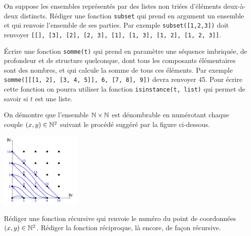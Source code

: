 \documentclass{magnolia}
\begin{document}



On suppose les ensembles représentés par des listes non triées d'éléments deux-à-deux
distincts. Rédiger une fonction \verb!subset! qui prend en argument un ensemble et qui
renvoie l'ensemble de ses parties. Par exemple \verb!subset([1,2,3])! doit
renvoyer \verb![[], [3], [2], [2, 3], [1], [1, 3], [1, 2], [1, 2, 3]]!.

Écrire une fonction \verb!somme(t)! qui prend en paramètre une séquence imbriquée, de
profondeur et de structure quelconque, dont tous les composants élémentaires sont des nombres,
et qui calcule la somme de tous ces éléments. Par exemple
\verb!somme([[[1, 2], [3, 4, 5]], 6, [7, 8], 9])! devra renvoyer 45. Pour écrire cette
fonction on pourra utiliser la fonction \verb!isinstance(t, list)! qui permet de savoir si
$t$ est une liste.

On démontre que l'ensemble $\mathbb{N}\times\mathbb{N}$ est dénombrable en numérotant chaque couple $(x,y)\in\mathbb{N}^2$ suivant le procédé suggéré par la figure ci-dessous.
\begin{center}
\includegraphics[width=0.3\textwidth]{../../Commun/Images/python-exos-rec-1.pdf}
\end{center}
\begin{questions}
\question Rédiger une fonction récursive qui renvoie le numéro du point de coordonnées $(x,y)\in\mathbb{N}^2$.
\question Rédiger la fonction réciproque, là encore, de façon récursive.
\end{questions}

\end{document}

